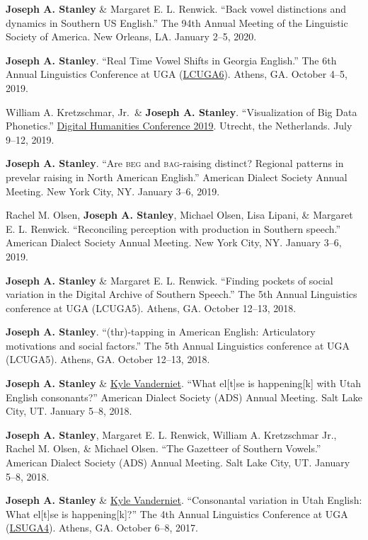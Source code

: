 \documentclass[
]{article}
\begin{document}
\textbf{Joseph A. Stanley} \& Margaret E. L. Renwick. ``Back vowel
distinctions and dynamics in Southern US English.'' The 94th Annual
Meeting of the Linguistic Society of America. New Orleans, LA. January
2--5, 2020.

\textbf{Joseph A. Stanley}. ``Real Time Vowel Shifts in Georgia
English.'' The 6th Annual Linguistics Conference at UGA
(\href{http://linguistics.uga.edu/lcuga-6}{LCUGA6}). Athens, GA. October
4--5, 2019.

William A. Kretzschmar, Jr.~\& \textbf{Joseph A. Stanley}.
``Visualization of Big Data Phonetics.''
\href{https://dh2019.adho.org}{Digital Humanities Conference 2019}.
Utrecht, the Netherlands. July 9--12, 2019.

\textbf{Joseph A. Stanley}. ``Are \textsc{beg} and \textsc{bag}-raising
distinct? Regional patterns in prevelar raising in North American
English.'' American Dialect Society Annual Meeting. New York City, NY.
January 3--6, 2019.

Rachel M. Olsen, \textbf{Joseph A. Stanley}, Michael Olsen, Lisa Lipani,
\& Margaret E. L. Renwick. ``Reconciling perception with production in
Southern speech.'' American Dialect Society Annual Meeting. New York
City, NY. January 3--6, 2019.

\textbf{Joseph A. Stanley} \& Margaret E. L. Renwick. ``Finding pockets
of social variation in the Digital Archive of Southern Speech.'' The 5th
Annual Linguistics conference at UGA (LCUGA5). Athens, GA. October
12--13, 2018.

\textbf{Joseph A. Stanley}. ``(thr)-tapping in American English:
Articulatory motivations and social factors.'' The 5th Annual
Linguistics conference at UGA (LCUGA5). Athens, GA. October 12--13,
2018.

\textbf{Joseph A. Stanley} \&
\href{https://clyguy.wixsite.com/profile}{Kyle Vanderniet}. ``What
el{[}t{]}se is happening{[}k{]} with Utah English consonants?'' American
Dialect Society (ADS) Annual Meeting. Salt Lake City, UT. January 5--8,
2018.

\textbf{Joseph A. Stanley}, Margaret E. L. Renwick, William A.
Kretzschmar Jr., Rachel M. Olsen, \& Michael Olsen. ``The Gazetteer of
Southern Vowels.'' American Dialect Society (ADS) Annual Meeting. Salt
Lake City, UT. January 5--8, 2018.

\textbf{Joseph A. Stanley} \&
\href{https://clyguy.wixsite.com/profile}{Kyle Vanderniet}.
``Consonantal variation in Utah English: What el{[}t{]}se is
happening{[}k{]}?'' The 4th Annual Linguistics Conference at UGA
(\href{http://www.linguistics.uga.edu/lcuga-4}{LSUGA4}). Athens, GA.
October 6--8, 2017.
\end{document}
